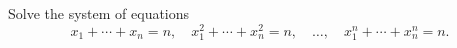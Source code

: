 Solve the system of equations
\[ x_1 + \cdots + x_n = n,\quad x_1^2 + \cdots + x_n^2 = n,\quad \ldots,\quad x_1^n + \cdots + x_n^n = n. \]
